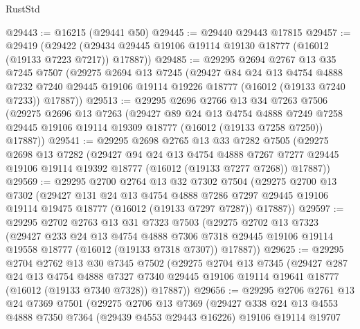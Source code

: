 \begin{lexlean}{RustStd}
\begin{coremodule}
@29443 := @16215 (@29441 @50)
@29445 := @29440 @29443 @17815
@29457 := @29419
    (@29422 (@29434 @29445 @19106 @19114 @19130 @18777 (@16012 (@19133 @7223 @7217)) @17887))
@29485 := @29295
    @2694
    @2767
    @13
    @35
    @7245
    @7507
    (@29275
      @2694
      @13
      @7245
      (@29427
        @84
        @24
        @13
        @4754
        @4888
        @7232
        @7240
        @29445
        @19106
        @19114
        @19226
        @18777
        (@16012 (@19133 @7240 @7233))
        @17887))
@29513 := @29295
    @2696
    @2766
    @13
    @34
    @7263
    @7506
    (@29275
      @2696
      @13
      @7263
      (@29427
        @89
        @24
        @13
        @4754
        @4888
        @7249
        @7258
        @29445
        @19106
        @19114
        @19309
        @18777
        (@16012 (@19133 @7258 @7250))
        @17887))
@29541 := @29295
    @2698
    @2765
    @13
    @33
    @7282
    @7505
    (@29275
      @2698
      @13
      @7282
      (@29427
        @94
        @24
        @13
        @4754
        @4888
        @7267
        @7277
        @29445
        @19106
        @19114
        @19392
        @18777
        (@16012 (@19133 @7277 @7268))
        @17887))
@29569 := @29295
    @2700
    @2764
    @13
    @32
    @7302
    @7504
    (@29275
      @2700
      @13
      @7302
      (@29427
        @131
        @24
        @13
        @4754
        @4888
        @7286
        @7297
        @29445
        @19106
        @19114
        @19475
        @18777
        (@16012 (@19133 @7297 @7287))
        @17887))
@29597 := @29295
    @2702
    @2763
    @13
    @31
    @7323
    @7503
    (@29275
      @2702
      @13
      @7323
      (@29427
        @233
        @24
        @13
        @4754
        @4888
        @7306
        @7318
        @29445
        @19106
        @19114
        @19558
        @18777
        (@16012 (@19133 @7318 @7307))
        @17887))
@29625 := @29295
    @2704
    @2762
    @13
    @30
    @7345
    @7502
    (@29275
      @2704
      @13
      @7345
      (@29427
        @287
        @24
        @13
        @4754
        @4888
        @7327
        @7340
        @29445
        @19106
        @19114
        @19641
        @18777
        (@16012 (@19133 @7340 @7328))
        @17887))
@29656 := @29295
    @2706
    @2761
    @13
    @24
    @7369
    @7501
    (@29275
      @2706
      @13
      @7369
      (@29427
        @338
        @24
        @13
        @4553
        @4888
        @7350
        @7364
        (@29439 @4553 @29443 @16226)
        @19106
        @19114
        @19707

\end{coremodule}
\end{lexlean}
